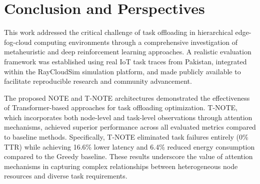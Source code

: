 \documentclass[preprint,3p,authoryear]{elsarticle}
\begin{document}




\section{Conclusion and Perspectives}\label{sec:conclusion}

This work addressed the critical challenge of task offloading in hierarchical edge-fog-cloud computing environments through a comprehensive investigation of metaheuristic and deep reinforcement learning approaches. A realistic evaluation framework was established using real IoT task traces from Pakistan, integrated within the RayCloudSim simulation platform, and made publicly available to facilitate reproducible research and community advancement.

The proposed NOTE and T-NOTE architectures demonstrated the effectiveness of Transformer-based approaches for task offloading optimization. T-NOTE, which incorporates both node-level and task-level observations through attention mechanisms, achieved superior performance across all evaluated metrics compared to baseline methods. Specifically, T-NOTE eliminated task failures entirely (0\% TTR) while achieving 16.6\% lower latency and 6.4\% reduced energy consumption compared to the Greedy baseline. These results underscore the value of attention mechanisms in capturing complex relationships between heterogeneous node resources and diverse task requirements.
\end{document}
